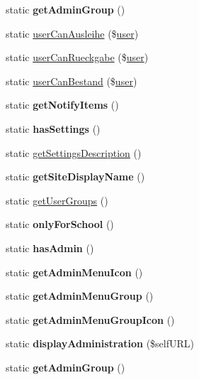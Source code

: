 \begin{DoxyCompactItemize}
\mbox{\label{classschulbuecher_ae116f4b15ceddbed5b37dd7cb5c68ec5}} 
static {\bfseries get\+Admin\+Group} ()
\item 
static \mbox{\hyperlink{classschulbuecher_adda60b34e8118f7fdef2ae3148ddfd93}{user\+Can\+Ausleihe}} (\$\mbox{\hyperlink{classuser}{user}})
\item 
static \mbox{\hyperlink{classschulbuecher_a98b5f41a4defc2164c52011b079f91f2}{user\+Can\+Rueckgabe}} (\$\mbox{\hyperlink{classuser}{user}})
\item 
static \mbox{\hyperlink{classschulbuecher_aab9a73a0e46b869e9c118dd6a0cdc528}{user\+Can\+Bestand}} (\$\mbox{\hyperlink{classuser}{user}})
\item 
\mbox{\label{classschulbuecher_ab2d2011c65282d5a7de466a26b0bb7ab}} 
static {\bfseries get\+Notify\+Items} ()
\item 
\mbox{\label{classschulbuecher_a4e47e84e628ae83287372bb2b2f11197}} 
static {\bfseries has\+Settings} ()
\item 
static \mbox{\hyperlink{classschulbuecher_a12bf8c79ff6d2b1fe8bf6eb845f87e2d}{get\+Settings\+Description}} ()
\item 
\mbox{\label{classschulbuecher_a55320d2950ca01d043a1a684d635a669}} 
static {\bfseries get\+Site\+Display\+Name} ()
\item 
static \mbox{\hyperlink{classschulbuecher_aa28fac3077eadbd8c7aed5e26a263508}{get\+User\+Groups}} ()
\item 
\mbox{\label{classschulbuecher_a068bca25d898be074171a1e0ffa1581c}} 
static {\bfseries only\+For\+School} ()
\item 
\mbox{\label{classschulbuecher_af9c0b0b25fa05a8a13fc3713cb376674}} 
static {\bfseries has\+Admin} ()
\item 
\mbox{\label{classschulbuecher_a55749b1871971e9718baf4655be7ed3d}} 
static {\bfseries get\+Admin\+Menu\+Icon} ()
\item 
\mbox{\label{classschulbuecher_acd0f73a2bf368287c2e49b0dd754f41b}} 
static {\bfseries get\+Admin\+Menu\+Group} ()
\item 
\mbox{\label{classschulbuecher_a692e650c4e7860c117640bbc4caba2b4}} 
static {\bfseries get\+Admin\+Menu\+Group\+Icon} ()
\item 
\mbox{\label{classschulbuecher_ad806f717f5ff89f63f58e6ee54a370e4}} 
static {\bfseries display\+Administration} (\$self\+U\+RL)
\item 
\mbox{\label{classschulbuecher_ae116f4b15ceddbed5b37dd7cb5c68ec5}} 
static {\bfseries get\+Admin\+Group} ()
\end{DoxyCompactItemize}
